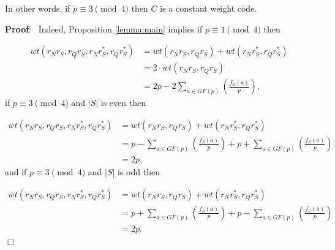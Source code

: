 \documentclass[submission%
]{dmtcs}
\def\pf{{\bf Proof}:\ }
\def\qed{$\Box$}
\begin{document}
In other words, if $p\equiv 3\pmod 4$ then $C$ is a constant weight code.

\pf
Indeed, Proposition \ref{lemma:main} implies
if $p\equiv 1\pmod 4$ then 

\begin{equation}
\label{eqn:symm}
\begin{array}{ll}
wt\left( {r}_N r_S, {r}_Q r_S, {r}_N r_S^*, {r}_Q r_S^*\right)
&= wt\left( {r}_N r_S, {r}_Q r_S\right)+
wt\left({r}_N r_S^*, {r}_Q r_S^*\right)\\
&=2\cdot wt\left( {r}_N r_S, {r}_Q r_S\right)\\
&=2p-2\sum_{a\in GF(p)} \left(\frac{f_S (a)}{p}\right),
\end{array}
\end{equation}
if $p\equiv 3\pmod 4$ and $|S|$ is even then

\begin{equation}
\label{eqn:symm3}
\begin{array}{ll}
wt\left( {r}_N r_S, {r}_Q r_S, {r}_N r_S^*, {r}_Q r_S^*\right)
&=wt\left( {r}_N r_S, {r}_Q r_S\right)+
wt\left({r}_N r_S^*, {r}_Q r_S^*\right)\\
&=p-\sum_{a\in GF(p)} \left(\frac{f_{S} (a)}{p}\right)+
p+\sum_{a\in GF(p)} \left(\frac{f_{S} (a)}{p}\right)\\
&=2p,
\end{array}
\end{equation}
and if $p\equiv 3\pmod 4$ and $|S|$ is odd then

\begin{equation}
\label{eqn:symm4}
\begin{array}{ll}
wt\left( {r}_N r_S, {r}_Q r_S, {r}_N r_S^*, {r}_Q r_S^*\right)
&=wt\left( {r}_N r_S, {r}_Q r_S\right)+
wt\left({r}_N r_S^*, {r}_Q r_S^*\right)\\
&=p+\sum_{a\in GF(p)} \left(\frac{f_{S} (a)}{p}\right)+
p-\sum_{a\in GF(p)} \left(\frac{f_{S} (a)}{p}\right)\\
&=2p.
\end{array}
\end{equation}
\qed
\end{document}
